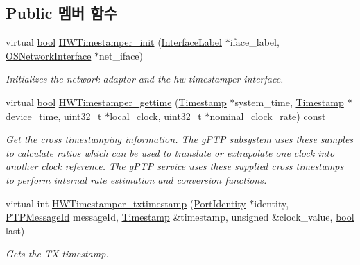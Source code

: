 \subsection*{Public 멤버 함수}
\begin{DoxyCompactItemize}
\item 
virtual \hyperlink{avb__gptp_8h_af6a258d8f3ee5206d682d799316314b1}{bool} \hyperlink{class_windows_ether_timestamper_a0bb8baec58abb2771c343d0e7d26902d}{H\+W\+Timestamper\+\_\+init} (\hyperlink{class_interface_label}{Interface\+Label} $\ast$iface\+\_\+label, \hyperlink{class_o_s_network_interface}{O\+S\+Network\+Interface} $\ast$net\+\_\+iface)
\begin{DoxyCompactList}\small\item\em Initializes the network adaptor and the hw timestamper interface. \end{DoxyCompactList}\item 
virtual \hyperlink{avb__gptp_8h_af6a258d8f3ee5206d682d799316314b1}{bool} \hyperlink{class_windows_ether_timestamper_aa60d500a2e0fe863918056be78c109ce}{H\+W\+Timestamper\+\_\+gettime} (\hyperlink{class_timestamp}{Timestamp} $\ast$system\+\_\+time, \hyperlink{class_timestamp}{Timestamp} $\ast$device\+\_\+time, \hyperlink{parse_8c_a6eb1e68cc391dd753bc8ce896dbb8315}{uint32\+\_\+t} $\ast$local\+\_\+clock, \hyperlink{parse_8c_a6eb1e68cc391dd753bc8ce896dbb8315}{uint32\+\_\+t} $\ast$nominal\+\_\+clock\+\_\+rate) const 
\begin{DoxyCompactList}\small\item\em Get the cross timestamping information. The g\+P\+TP subsystem uses these samples to calculate ratios which can be used to translate or extrapolate one clock into another clock reference. The g\+P\+TP service uses these supplied cross timestamps to perform internal rate estimation and conversion functions. \end{DoxyCompactList}\item 
virtual int \hyperlink{class_windows_ether_timestamper_ade95e0e8d5fc8ec21dbf7b67bd1d9275}{H\+W\+Timestamper\+\_\+txtimestamp} (\hyperlink{class_port_identity}{Port\+Identity} $\ast$identity, \hyperlink{class_p_t_p_message_id}{P\+T\+P\+Message\+Id} message\+Id, \hyperlink{class_timestamp}{Timestamp} \&timestamp, unsigned \&clock\+\_\+value, \hyperlink{avb__gptp_8h_af6a258d8f3ee5206d682d799316314b1}{bool} last)
\begin{DoxyCompactList}\small\item\em Gets the TX timestamp. \end{DoxyCompactList}\item 

\end{DoxyCompactItemize}
